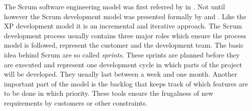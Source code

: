 The Scrum software engineering model was first referred by
\textcite{DeGrace1990} in \citeyear{DeGrace1990}. Not until
\citeyear{Sutherland1995} however the Scrum development model was presented
formally by \textcite{Sutherland1995} and \textcite{Schwaber1995}. Like the
\acl{XP} development model it is an incremental and iterative approach. The
Scrum development process usually contains three major roles which ensure the
process model is followed, represent the customer and the development team. The
basic idea behind Scrum are so called \emph{sprints}. These sprints are planned
before they are executed and represent one development cycle in which parts of
the project will be developed. They usually last between a week and one month.
Another important part of the model is the backlog that keeps track of which
features are to be done in which priority. These tools ensure the frugalness of
new requirements by customers or other constraints.



